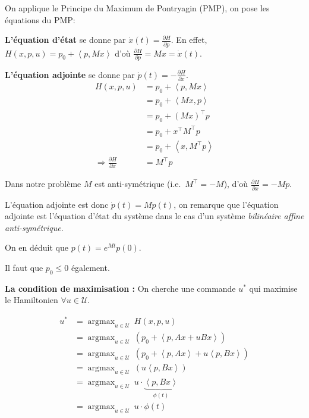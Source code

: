\documentclass[
  french,
]{article}
\begin{document}
On applique le Principe du Maximum de Pontryagin (PMP),
on pose les équations du PMP:

\textbf{L'équation d'état} se donne par \(\dot{x}(t)= \frac{\partial H}{\partial p}\).
En effet, \(H(x,p,u) = p_0 + \left\langle p{,}Mx\right\rangle\) d'où
\(\frac{\partial H}{\partial p} = Mx = \dot{x}(t)\).

\textbf{L'équation adjointe} se donne par \(\dot{p}(t) = -\frac{\partial H}{\partial x}\).
\begin{align}
H(x, p, u) &= p_0 + \left\langle p{,}Mx\right\rangle\\
    &= p_0 + \left\langle Mx{,}p\right\rangle\\
    &= p_0 + {\left(Mx\right)}^{\top}p\\
    &= p_0 + {x}^{\top}{M}^{\top}p\\
    &= p_0 + \left\langle x{,}{M}^{\top}p\right\rangle\\
\Rightarrow\frac{\partial H}{\partial x} &= {M}^{\top}p
\end{align}

Dans notre problème \(M\) est anti-symétrique
(i.e.~\({M}^{\top} = -M\)), d'où \(\frac{\partial H}{\partial x} = -Mp\).

L'équation adjointe est donc \(\dot{p}(t) = M p(t)\),
on remarque que l'équation adjointe est l'équation
d'état du système dans le cas d'un système \emph{bilinéaire
affine anti-symétrique}.

On en déduit que \(p(t) = e^{Mt}p(0)\).

Il faut que \(p_0 \leq 0\) également.

\textbf{La condition de maximisation :}
On cherche une commande \(u^*\) qui maximise le Hamiltonien
\(\forall u\in\mathcal{U}\).

\begin{align}
u^* &= \mathop{\mathrm{argmax}}_{u\in\mathcal{U}}~H(x, p, u)\\
    &= \mathop{\mathrm{argmax}}_{u\in\mathcal{U}}~\left(p_0 + \left\langle p{,}Ax + uBx\right\rangle\right)\\
    &= \mathop{\mathrm{argmax}}_{u\in\mathcal{U}}~\left(p_0 + \left\langle p{,}Ax\right\rangle + u\left\langle p{,}Bx\right\rangle\right)\\
    &= \mathop{\mathrm{argmax}}_{u\in\mathcal{U}}~\left(u\left\langle p{,}Bx\right\rangle\right)\\
    &= \mathop{\mathrm{argmax}}_{u\in\mathcal{U}}~u\cdot\underbrace{\left\langle p{,}Bx\right\rangle}_{\phi(t)}\\
    &= \mathop{\mathrm{argmax}}_{u\in\mathcal{U}}~u\cdot\phi(t)
\end{align}
\end{document}
